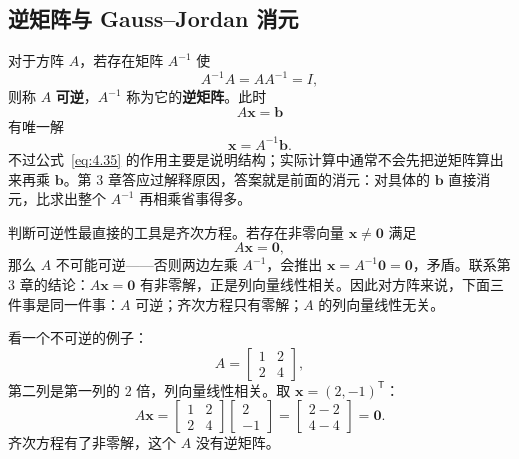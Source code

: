 \documentclass[UTF8,a4paper,12pt]{ctexart}
\numberwithin{equation}{section}
\newcommand{\trans}{^{\mathsf T}}
\begin{document}
	\subsection{逆矩阵与 Gauss--Jordan 消元}
	
	对于方阵 $A$，若存在矩阵 $A^{-1}$ 使
	\begin{equation}\label{eq:4.33}
	A^{-1}A=AA^{-1}=I,
	\end{equation}
	则称 $A$ \textbf{可逆}，$A^{-1}$ 称为它的\textbf{逆矩阵}。此时
	\begin{equation}\label{eq:4.34}
	A\bm{x}=\bm{b}
	\end{equation}
	有唯一解
	\begin{equation}\label{eq:4.35}
	\bm{x}=A^{-1}\bm{b}.
	\end{equation}
不过公式~\eqref{eq:4.35} 的作用主要是说明结构；实际计算中通常不会先把逆矩阵算出来再乘 $\bm{b}$。第 3 章答应过解释原因，答案就是前面的消元：对具体的 $\bm{b}$ 直接消元，比求出整个 $A^{-1}$ 再相乘省事得多。
	
	判断可逆性最直接的工具是齐次方程。若存在非零向量 $\bm{x}\neq\bm{0}$ 满足
	\begin{equation}\label{eq:4.36}
	A\bm{x}=\bm{0},
	\end{equation}
	那么 $A$ 不可能可逆——否则两边左乘 $A^{-1}$，会推出 $\bm{x}=A^{-1}\bm{0}=\bm{0}$，矛盾。联系第 3 章的结论：$A\bm{x}=\bm{0}$ 有非零解，正是列向量线性相关。因此对方阵来说，下面三件事是同一件事：$A$ 可逆；齐次方程只有零解；$A$ 的列向量线性无关。
	
	看一个不可逆的例子：
	\begin{equation}\label{eq:4.37}
	A=
	\begin{bmatrix}
		1&2\\
		2&4
	\end{bmatrix},
	\end{equation}
	第二列是第一列的 $2$ 倍，列向量线性相关。取 $\bm{x}=(2,-1)\trans$：
	\begin{equation}\label{eq:4.38}
	A\bm{x}
	=
	\begin{bmatrix}
		1&2\\
		2&4
	\end{bmatrix}
	\begin{bmatrix}
		2\\-1
	\end{bmatrix}
	=
	\begin{bmatrix}
		2-2\\
		4-4
	\end{bmatrix}
	=
	\bm{0}.
	\end{equation}
	齐次方程有了非零解，这个 $A$ 没有逆矩阵。
	
\end{document}
